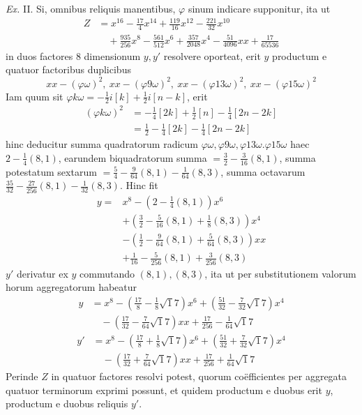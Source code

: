 \textit{Ex.} II. Si, omnibus reliquis manentibus, \(\varphi\) sinum indicare supponitur, ita ut \[\begin{aligned}Z&=x^{16}-\tfrac{17}4x^{14}+\tfrac{119}{16}x^{12}-\tfrac{221}{32}x^{10}\\&\quad+\tfrac{935}{256}x^8-\tfrac{561}{512}x^6+\tfrac{357}{2048}x^4-\tfrac{51}{4096}xx+\tfrac{17}{65536}\end{aligned}\] in duos factores 8 dimensionum \(y,\allowbreak y'\) resolvere oporteat, erit \(y\) productum e
quatuor factoribus duplicibus \[xx-(\varphi\omega)^2,\ xx-(\varphi9\omega)^2,\ xx-(\varphi13\omega)^2,\ xx-(\varphi15\omega)^2\] Iam quum sit \(\varphi k\omega=-\tfrac12i[k]+\tfrac12i[n-k]\), erit \[\begin{aligned}(\varphi k\omega)^2&=-\tfrac14[2k]+\tfrac12[n]-\tfrac14[2n-2k]\\&=\tfrac12-\tfrac14[2k]-\tfrac14[2n-2k]\end{aligned}\] hinc deducitur summa quadratorum radicum \(\varphi\omega,\allowbreak \varphi9\omega,\allowbreak \varphi13\omega.\varphi15\omega\) haec \(2-\tfrac14(8,1)\), earundem biquadratorum summa \(=\tfrac32-\tfrac3{16}(8,1)\), summa potestatum sextarum \(=\tfrac54-\tfrac9{64}(8,1)-\tfrac1{64}(8,3)\), summa octavarum \(\tfrac{35}{32}-\tfrac{27}{256}(8,1)-\tfrac1{32}(8,3)\). Hinc fit \[\begin{aligned}y={}&x^8-(2-\tfrac14(8,1))x^6\\&+(\tfrac32-\tfrac5{16}(8,1)+\tfrac18(8,3))x^4\\&-(\tfrac12-\tfrac9{64}(8,1)+\tfrac5{64}(8,3))xx\\&+\tfrac1{16}-\tfrac5{256}(8,1)+\tfrac3{256}(8,3)\end{aligned}\] \(y'\) derivatur ex \(y\) commutando \((8,1),\allowbreak (8,3)\), ita ut per substitutionem valorum horum aggregatorum habeatur \[\begin{aligned}y&=x^8-(\tfrac{17}8-\tfrac18\surd17)x^6+(\tfrac{51}{32}-\tfrac7{32}\surd17)x^4\\&\quad-(\tfrac{17}{32}-\tfrac7{64}\surd17)xx+\tfrac{17}{256}-\tfrac1{64}\surd17\end{aligned}\] \[\begin{aligned}y'&=x^8-(\tfrac{17}8+\tfrac18\surd17)x^6+(\tfrac{51}{32}+\tfrac7{32}\surd17)x^4\\&\quad-(\tfrac{17}{32}+\tfrac7{64}\surd17)xx+\tfrac{17}{256}+\tfrac1{64}\surd17\end{aligned}\] Perinde \(Z\) in quatuor factores resolvi potest, quorum coëfficientes per aggregata quatuor terminorum exprimi possunt, et quidem productum e duobus erit \(y\), productum e duobus reliquis \(y'\).

